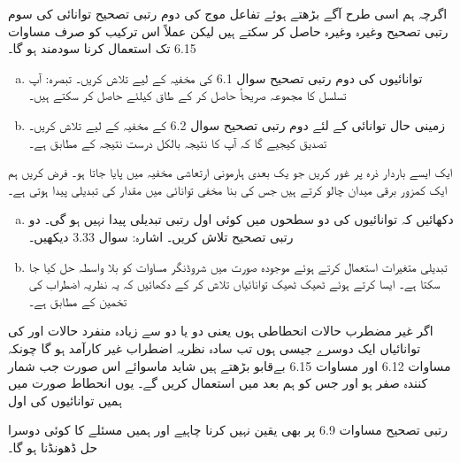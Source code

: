  اگرچہ ہم اسی طرح آگے بڑھتے ہوئے تفاعل موج  کی  دوم رتبی تصحیح   توانائی کی سوم  رتبی تصحیح  وغیرہ وغیرہ حاصل کر سکتے ہیں لیکن عملاً اس ترکیب کو صرف مساوات 6.15 تک استعمال کرنا سودمند  ہو گا۔
\begin{enumerate}[a.]
\item
توانائیوں کی  دوم رتبی  تصحیح   سوال 6.1 کی مخفیہ کے لیے تلاش کریں۔ تبصرہ: آپ تسلسل کا مجموعہ صریحاً حاصل کر کے طاق  کیلئے
  حاصل کر سکتے ہیں۔
\item
زمینی حال توانائی کے لئے دوم رتبی تصحیح   سوال 6.2 کے مخفیہ کے لیے تلاش کریں۔ تصدیق کیجیے گا کہ آپ کا نتیجہ بالکل درست نتیجہ کے مطابق ہے۔ 
\end{enumerate}
ایک ایسے  باردار  ذرہ پر غور کریں جو یک بعدی ہارمونی ارتعاشی مخفیہ  میں پایا جاتا ہو۔ فرض کریں  ہم ایک کمزور برقی میدان  چالو کرتے ہیں جس کی بنا مخفی توانائی میں  مقدار کی تبدیلی پیدا ہوتی ہے۔
\begin{enumerate}[a.]
\item
دکھائیں کہ توانائیوں کی  دو سطحوں میں کوئی اول رتبی تبدیلی پیدا نہیں ہو گی۔ دو رتبی تصحیح  تلاش کریں۔ اشارہ: سوال 3.33 دیکھیں۔
\item
تبدیلی متغیرات  استعمال کرتے ہوئے موجودہ صورت میں شروڈنگر مساوات کو بلا واسطہ حل کیا جا سکتا ہے۔ ایسا کرتے ہوئے ٹھیک ٹھیک توانائیاں تلاش کر کے دکھائیں کہ یہ نظریہ اضطراب کی تخمین کے مطابق ہے۔
\end{enumerate}

اگر غیر مضطرب حالات انحطاطی ہوں یعنی دو یا دو سے زیادہ منفرد حالات  اور  کی توانائیاں ایک دوسرے جیسی ہوں تب سادہ نظریہ اضطراب غیر کارآمد ہو گا  چونکہ  مساوات 6.12 اور  مساوات 6.15 بےقابو بڑھتے ہیں شاید  ماسوائے اس صورت جب شمار کنندہ صفر ہو  اور جس کو ہم بعد میں استعمال کریں گے۔ یوں  انحطاط صورت میں ہمیں توانائیوں کی اول 

رتبی تصحیح مساوات 6.9 پر بھی یقین نہیں کرنا چاہیے اور ہمیں مسئلے کا کوئی دوسرا حل ڈھونڈنا   ہو گا۔

